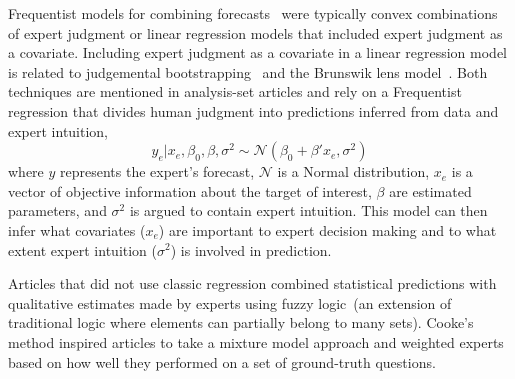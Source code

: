 \documentclass[preprint,authoryear,nonatbib]{elsarticle}
\begin{document}
Frequentist models for combining forecasts~\parencite{cooke2014out,klas2010support,mak1996aggregating,hurley2002combining,morales2017characterization,borsuk2004predictive,hanea2018value,cabello2012combination,adams2009acceptability,alho1992estimating,evans1994use,jana2019interval,hora2015calibration,hathout2016uncertainty,wang2008probabilistic,ren2002optimal,kurowicka2010probabilistic,baldwin2015weighting,baecke2017investigating,seifert2013relative,gu2016expert,mu1999multi,graefe2014combining,alvarado2017expertise,shin2013robust,franses2011averaging} were typically convex combinations of expert judgment or linear regression models that included expert judgment as a covariate.
Including expert judgment as a covariate in a linear regression model is related to judgemental bootstrapping~\parencite{armstrong2001judgmental} and the Brunswik lens model~\parencite{hammond2001essential}. 
Both techniques are mentioned in analysis-set articles and rely on a Frequentist regression that divides human judgment into predictions inferred from data and expert intuition,
\begin{equation*}
  y_{e} | x_{e}, \beta_{0}, \beta, \sigma^{2}  \sim \mathcal{N}( \beta_{0} + \beta'x_{e} ,\sigma^{2})
\end{equation*}
where $y$ represents the expert's forecast, $\mathcal{N}$ is a Normal distribution, $x_{e}$ is a vector of objective information about the target of interest, $\beta$ are estimated parameters, and $\sigma^{2}$ is argued to contain expert intuition.
This model can then infer what covariates ($x_{e}$) are important to expert decision making and to what extent expert intuition ($\sigma^{2}$) is involved in prediction.

Articles that did not use classic regression combined statistical predictions with qualitative estimates made by experts using fuzzy logic~(an extension of traditional logic where elements can partially belong to many sets).
Cooke's method inspired articles to take a mixture model approach and weighted experts based on how well they performed on a set of ground-truth questions.
\end{document}
